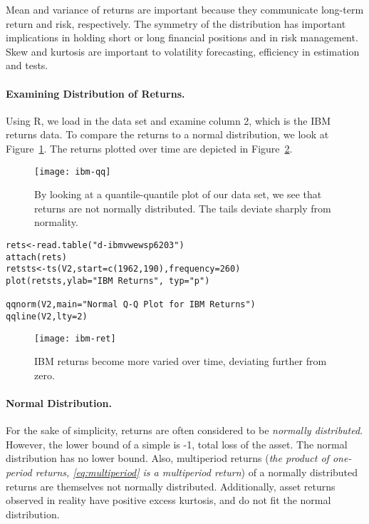 Mean and variance of returns are important because they communicate long-term return and risk, respectively. The symmetry of the distribution has important implications in holding short or long financial positions and in risk management. Skew and kurtosis are important to volatility forecasting, efficiency in estimation and tests. 

\paragraph{Examining Distribution of Returns.} Using R, we load in the data set and examine column 2, which is the IBM returns data. To compare the returns to a normal distribution, we look at Figure~\ref{figure:ibm-qq}. The returns plotted over time are depicted in Figure~\ref{figure:ibm-ret}.
\begin{figure}[tb]
  \centering
  \texttt{[image: ibm-qq]}
  \caption[Q-Q Plot of Returns]{By looking at a quantile-quantile plot of our data set, we see that returns are not normally distributed. The tails deviate sharply from normality.}
  \label{figure:ibm-qq}
\end{figure}

\begin{verbatim}
rets<-read.table("d-ibmvwewsp6203")
attach(rets)
retsts<-ts(V2,start=c(1962,190),frequency=260)
plot(retsts,ylab="IBM Returns", typ="p") 

qqnorm(V2,main="Normal Q-Q Plot for IBM Returns")
qqline(V2,lty=2)
\end{verbatim}

\begin{figure}[tb]
  \centering
  \texttt{[image: ibm-ret]}
  \caption[IBM Returns]{IBM returns become more varied over time, deviating further from zero.}
  \label{figure:ibm-ret}
\end{figure}

\paragraph{Normal Distribution.} For the sake of simplicity, returns are often considered to be \emph{\mbox{normally} distributed}. However, the lower bound of a simple is -1, total loss of the asset. The normal distribution has no lower bound. Also, multiperiod returns (\emph{the product of one-period \mbox{returns}, \eqref{eq:multiperiod} is a multiperiod return}) of a normally distributed returns are themselves not normally distributed. Additionally, asset returns observed in reality have positive excess kurtosis, and do not fit the normal distribution.


